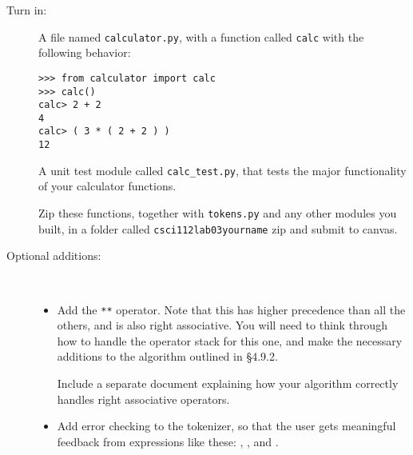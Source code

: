 \documentclass{article}
\newcommand{\bi}{\begin{itemize}}
\newcommand{\li}{\item}
\newcommand{\ei}{\end{itemize}}
\begin{document}
\begin{description}
\item[Turn in:]  A file named \lstinline{calculator.py}, with a function
called \lstinline{calc} with the following behavior:
\begin{lstlisting}
>>> from calculator import calc
>>> calc()
calc> 2 + 2
4
calc> ( 3 * ( 2 + 2 ) )
12
\end{lstlisting}

A unit test module called \lstinline{calc_test.py}, that tests the major
functionality of your calculator functions.

Zip these functions, together with \lstinline{tokens.py} and any other
modules you built, in a folder called \lstinline{csci112lab03yourname} zip and submit to canvas.

\item[Optional additions:]~ 

\bi
\li Add the \lstinline{**} operator.  Note that this has higher precedence
than all the others, and is also right associative.  You will need to think through
how to handle the operator stack for this one, and make the necessary
additions to the algorithm outlined in \S 4.9.2.

Include  a separate document explaining how your
algorithm correctly handles right associative operators.


\li Add error checking to the tokenizer, so that the user gets meaningful
feedback from expressions like these:
, 
, and
.


\ei


\end{description}
\end{document}

